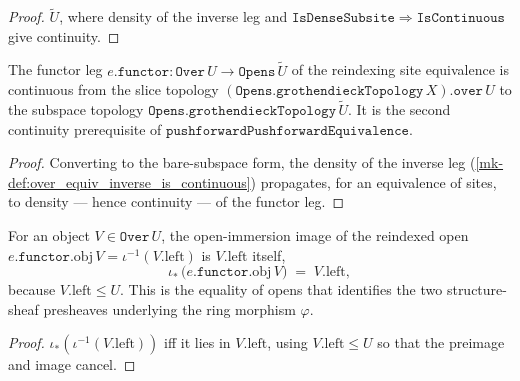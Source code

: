 \begin{proof}
  \leanok
  \(\widetilde{U}\), where density of the inverse leg and
  \(\mathtt{IsDenseSubsite} \Rightarrow \mathtt{IsContinuous}\) give continuity.
\end{proof}

\begin{definition}\label{mk-def:over_equiv_functor_is_continuous}
  \leanok

  The functor leg \(e.\mathtt{functor} : \mathtt{Over}\,U \to
  \mathtt{Opens}\,\widetilde{U}\) of the reindexing site equivalence is continuous
  from the slice topology \((\mathtt{Opens.grothendieckTopology}\,X).\mathtt{over}\,U\)
  to the subspace topology \(\mathtt{Opens.grothendieckTopology}\,\widetilde{U}\). It
  is the second continuity prerequisite of
  \(\mathtt{pushforwardPushforwardEquivalence}\).
\end{definition}

\begin{proof}
  \leanok
 Converting to the bare-subspace form, the density of the
  inverse leg (\ref{mk-def:over_equiv_inverse_is_continuous}) propagates, for an
  equivalence of sites, to density --- hence continuity --- of the functor leg.
\end{proof}

\begin{lemma}\label{mk-lem:image_overequiv_functor_obj}
  \leanok

  For an object \(V \in \mathtt{Over}\,U\), the open-immersion image of the
  reindexed open \(e.\mathtt{functor}.\mathrm{obj}\,V = \iota^{-1}(V.\mathrm{left})\)
  is \(V.\mathrm{left}\) itself,
  \[
    \iota_{\ast}\,\bigl(e.\mathtt{functor}.\mathrm{obj}\,V\bigr)
      \;=\; V.\mathrm{left},
  \]
  because \(V.\mathrm{left} \le U\). This is the equality of opens that identifies
  the two structure-sheaf presheaves underlying the ring morphism \(\varphi\).
\end{lemma}

\begin{proof}
  \leanok
  \(\iota_{\ast}(\iota^{-1}(V.\mathrm{left}))\) iff it lies in
  \(V.\mathrm{left}\), using \(V.\mathrm{left} \le U\) so that the preimage and
  image cancel.
\end{proof}

